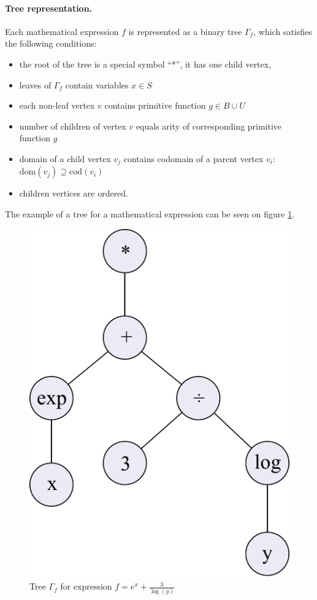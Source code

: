 \documentclass[12pt]{article}
\let\originalparagraph\paragraph
\renewcommand{\paragraph}[2][.]{\originalparagraph{#2#1}}
\begin{document}
\paragraph{Tree representation}
\label{sec::tree}
Each mathematical expression $f$ is represented as a binary tree $\Gamma_f$, which satisfies the following conditions:
\begin{itemize}
  \item the root of the tree is a special symbol ``*'', it has one child vertex,
  \item leaves of $\Gamma_f$ contain variables $x \in S$
  \item each non-leaf vertex $v$ contains primitive function $g \in B\cup U$
  \item number of children of vertex $v$ equals arity of corresponding primitive function $g$
  \item domain of a child vertex $v_j$ contains codomain of a parent vertex $v_i$: $\text{dom}(v_j) \supseteq \text{cod}(v_i)$
  \item children vertices are ordered.
\end{itemize}
The example of a tree for a mathematical expression can be seen on figure \ref{fig::tree}.
\begin{figure}[!h]
\centering
\includegraphics[scale=0.8]{tree.pdf}
\caption{Tree $\Gamma_f$ for expression $f = e^x + \frac{3}{\log(y)}$}
\label{fig::tree}
\end{figure}
\end{document}
